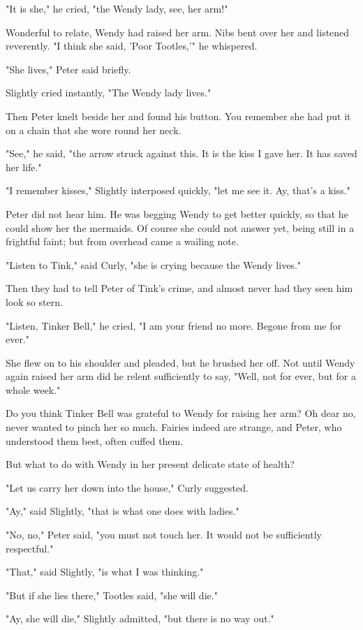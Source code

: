 "It is she," he cried, "the Wendy lady, see, her arm!"

Wonderful to relate, Wendy had raised her arm.
Nibs bent over her and listened reverently.
"I think she said, 'Poor Tootles,'" he whispered.

"She lives," Peter said briefly.

Slightly cried instantly, "The Wendy lady lives."

Then Peter knelt beside her and found his button.
You remember she had put it on a chain that she wore round her neck.

"See," he said, "the arrow struck against this.
It is the kiss I gave her.
It has saved her life."

"I remember kisses," Slightly interposed quickly, "let me see it.
Ay, that's a kiss."

Peter did not hear him.
He was begging Wendy to get better quickly, so that he could show her the mermaids.
Of course she could not answer yet, being still in a frightful faint;
but from overhead came a wailing note.

"Listen to Tink," said Curly, "she is crying because the Wendy lives."

Then they had to tell Peter of Tink's crime, and almost never had they seen him look so stern.

"Listen, Tinker Bell," he cried, "I am your friend no more.
Begone from me for ever."

She flew on to his shoulder and pleaded, but he brushed her off.
Not until Wendy again raised her arm did he relent sufficiently to say, "Well, not for ever, but for a whole week."

Do you think Tinker Bell was grateful to Wendy for raising her arm?
Oh dear no, never wanted to pinch her so much.
Fairies indeed are strange, and Peter, who understood them best, often cuffed them.

But what to do with Wendy in her present delicate state of health?

"Let us carry her down into the house," Curly suggested.

"Ay," said Slightly, "that is what one does with ladies."

"No, no," Peter said, "you must not touch her.
It would not be sufficiently respectful."

"That," said Slightly, "is what I was thinking."

"But if she lies there," Tootles said, "she will die."

"Ay, she will die," Slightly admitted, "but there is no way out."

